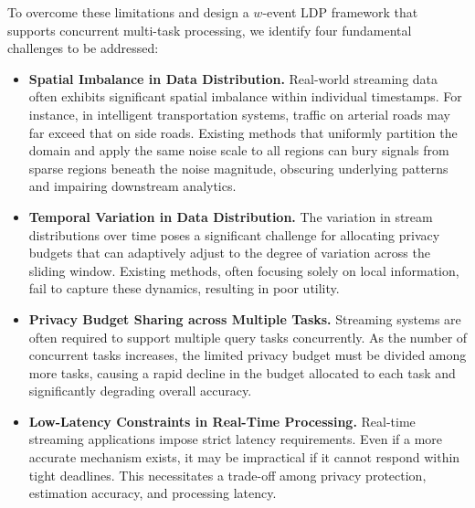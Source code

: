 To overcome these limitations and design a $w$-event LDP framework that supports
concurrent multi-task processing, we identify four fundamental challenges to be
addressed:
\begin{itemize}[nosep]
\item \textbf{Spatial Imbalance in Data Distribution.}
  Real-world streaming data often exhibits significant spatial imbalance within
  individual timestamps.
  For instance, in intelligent transportation systems, traffic on arterial roads
  may far exceed that on side roads.
  Existing methods that uniformly partition the domain and apply the same noise scale to all regions can bury signals from sparse regions beneath the noise magnitude, obscuring underlying patterns and impairing downstream analytics.

\item \textbf{Temporal Variation in Data Distribution.}
  The variation in stream distributions over time poses a significant challenge for
  allocating privacy budgets that can adaptively adjust to the degree of
  variation across the sliding window.
  Existing methods, often focusing solely on local information, fail to capture these dynamics, resulting in poor utility.

\item \textbf{Privacy Budget Sharing across Multiple Tasks.}
  Streaming systems are often required to support multiple query tasks
  concurrently.
  As the number of concurrent tasks increases, the limited privacy budget must
  be divided among more tasks, causing a rapid decline in the budget allocated
  to each task and significantly degrading overall accuracy.

\item \textbf{Low-Latency Constraints in Real-Time Processing.}
  Real-time streaming applications impose strict latency requirements.
  Even if a more accurate mechanism exists, it may be impractical if it cannot
  respond within tight deadlines.
  This necessitates a trade-off among privacy protection, estimation accuracy,
  and processing latency.
\end{itemize}

